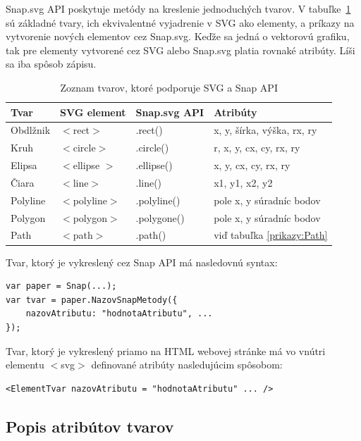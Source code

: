 Snap.svg API poskytuje metódy na kreslenie jednoduchých tvarov. V tabuľke~\ref{porovnanieSVG:Snap} sú základné tvary, ich ekvivalentné vyjadrenie v SVG ako elementy, a  príkazy na vytvorenie nových elementov cez Snap.svg. Keďže sa jedná o vektorovú grafiku, tak pre elementy vytvorené cez SVG alebo Snap.svg platia rovnaké atribúty. Líši sa iba spôsob zápisu. 

\begin{table}[H]
	\begin{center}
		\begin{tabular}{|l|l|l|l|}
			\hline \textbf{Tvar} & \textbf{SVG element} & \textbf{Snap.svg API} & \textbf{Atribúty} \\  \hline
			\hline Obdlžnik & $<$rect$>$ & .rect() & x, y, šírka, výška, rx, ry \\ 
			\hline Kruh & $<$circle$>$ & .circle() & r, x, y, cx, cy, rx, ry \\ 
			\hline Elipsa & $<$ellipse $>$ & .ellipse() & x, y, cx, cy, rx, ry \\ 
			\hline Čiara & $<$line$>$ & .line() & x1, y1, x2, y2 \\ 
			\hline Polyline & $<$polyline$>$ & .polyline() & pole x, y súradníc bodov \\ 
			\hline Polygon & $<$polygon$>$ & .polygone() & pole x, y súradníc bodov \\ 
			\hline Path & $<$path$>$ & .path() & viď tabuľka \ref{prikazy:Path}  \\ 
			\hline 
		\end{tabular} 
	\end{center}
	\label{porovnanieSVG:Snap}
	\caption{Zoznam tvarov, ktoré podporuje SVG a Snap API}
\end{table}

Tvar, ktorý je vykreslený cez Snap API má nasledovnú syntax: 

\begin{lstlisting}
var paper = Snap(...);
var tvar = paper.NazovSnapMetody({
	nazovAtributu: "hodnotaAtributu", ...
});
\end{lstlisting}

Tvar, ktorý je vykreslený priamo na HTML webovej stránke má vo vnútri elementu $<$svg$>$ definované atribúty nasledujúcim spôsobom: 

\begin{lstlisting}
<ElementTvar nazovAtributu = "hodnotaAtributu" ... />
\end{lstlisting}

\subsection{Popis atribútov tvarov}

